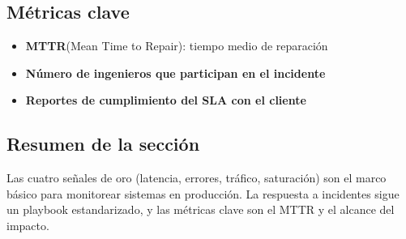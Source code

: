 \subsection{Métricas clave}

\begin{itemize}
    \item \textbf{MTTR}(Mean Time to Repair): tiempo medio de reparación
    \item \textbf{Número de ingenieros que participan en el incidente}
    \item \textbf{Reportes de cumplimiento del SLA con el cliente}
\end{itemize}

\subsection{Resumen de la sección}

Las cuatro señales de oro (latencia, errores, tráfico, saturación) son el marco básico para monitorear sistemas en producción. La respuesta a incidentes sigue un playbook estandarizado, y las métricas clave son el MTTR y el alcance del impacto.

